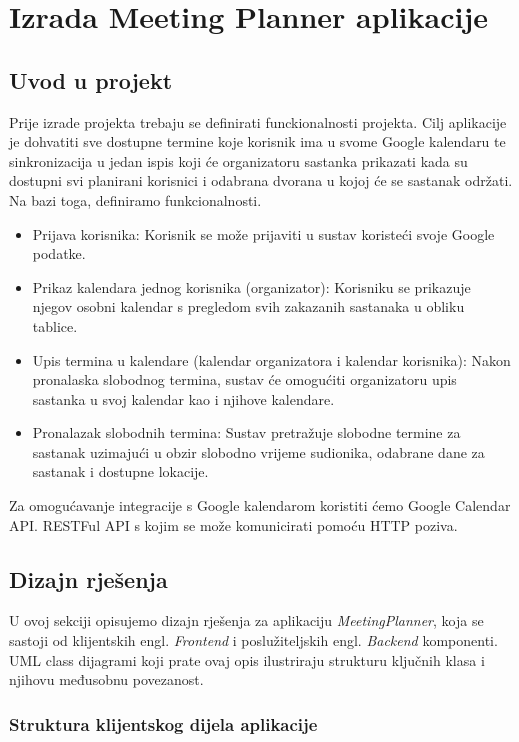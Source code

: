 \documentclass{foi}
\begin{document}
\chapter{Izrada Meeting Planner aplikacije}
\section{Uvod u projekt}
Prije izrade projekta trebaju se definirati funckionalnosti projekta. Cilj aplikacije je dohvatiti sve dostupne termine koje korisnik ima u svome Google kalendaru te sinkronizacija u jedan ispis koji će organizatoru sastanka prikazati kada su dostupni svi planirani korisnici i odabrana dvorana u kojoj će se sastanak održati. 
Na bazi toga, definiramo funkcionalnosti.
\begin{itemize}
    \item Prijava korisnika: Korisnik se može prijaviti u sustav koristeći svoje Google podatke.
    \item Prikaz kalendara jednog korisnika (organizator): Korisniku se prikazuje njegov osobni kalendar s pregledom svih zakazanih sastanaka u obliku tablice.
    \item Upis termina u kalendare (kalendar organizatora i kalendar korisnika): Nakon pronalaska slobodnog termina, sustav će omogućiti organizatoru upis sastanka u svoj kalendar kao i njihove kalendare.
    \item Pronalazak slobodnih termina: Sustav pretražuje slobodne termine za sastanak uzimajući u obzir slobodno vrijeme sudionika, odabrane dane za sastanak i dostupne lokacije.
\end{itemize}
Za omogućavanje integracije s Google kalendarom koristiti ćemo Google Calendar API. RESTFul API s kojim se može komunicirati pomoću HTTP poziva.
\section{Dizajn rješenja}

U ovoj sekciji opisujemo dizajn rješenja za aplikaciju \textit{MeetingPlanner}, koja se sastoji od klijentskih {engl. \textit{Frontend}} i poslužiteljskih {engl. \textit{Backend}} komponenti. UML class dijagrami koji prate ovaj opis ilustriraju strukturu ključnih klasa i njihovu međusobnu povezanost.

\subsection{Struktura klijentskog dijela aplikacije}
\end{document}
